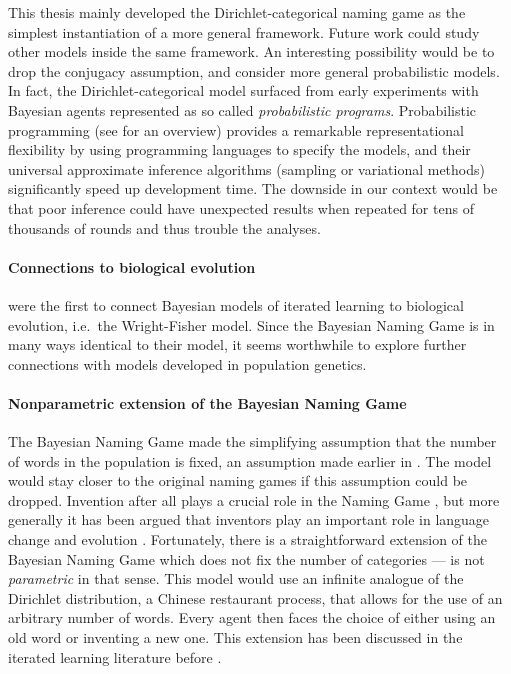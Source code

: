 \documentclass{../src/bcthesispart}
\begin{document}
This thesis mainly developed the Dirichlet-categorical naming game as the simplest instantiation of a more general framework.
Future work could study other models inside the same framework.
An interesting possibility would be to drop the conjugacy assumption, and consider more general probabilistic models.
In fact, the Dirichlet-categorical model surfaced from early experiments with Bayesian agents represented as so called \emph{probabilistic programs}.
Probabilistic programming (see \cite{Ghahramani2015} for an overview) provides a remarkable representational flexibility by using programming languages to specify the models, and their universal approximate inference algorithms (sampling or variational methods) significantly speed up development time.
The downside in our context would be that poor inference could have unexpected results when repeated for tens of thousands of rounds and thus trouble the analyses.


\paragraph{Connections to biological evolution}

\textcite{Reali2010} were the first to connect Bayesian models of iterated learning to biological evolution, i.e.\ the Wright-Fisher model. 
Since the Bayesian Naming Game is in many ways identical to their model, it seems worthwhile to explore further connections with models developed in population genetics. 




\paragraph{Nonparametric extension of the Bayesian Naming Game}

The Bayesian Naming Game made the simplifying assumption that the number of words in the population is fixed, an assumption made earlier in \textcite{DeVylder2006}.
The model would stay closer to the original naming games if this assumption could be dropped.
Invention after all plays a crucial role in the Naming Game \parencite{Steels2011}, but more generally it has been argued that inventors play an important role in language change and evolution \parencite{Hurford1987}.
Fortunately, there is a straightforward extension of the Bayesian Naming Game which does not fix the number of categories — is not \emph{parametric} in that sense.
This model would use an infinite analogue of the Dirichlet distribution, a Chinese restaurant process, that allows for the use of an arbitrary number of words.
Every agent then faces the choice of either using an old word or inventing a new one.
This extension has been discussed in the iterated learning literature before  \textcite{Reali2010,Burkett2010}.
\end{document}
